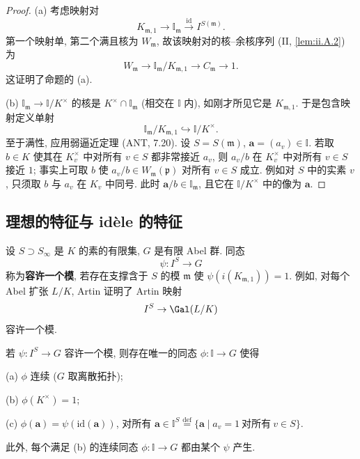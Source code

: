 \begin{proof}
(a) 考虑映射对
\[
K_{\mathfrak{m},1}\to\mathbb{I}_{\mathfrak{m}}\xrightarrow{\ \mathrm{id}\ }I^{S(\mathfrak{m})}.
\]
第一个映射单, 第二个满且核为 $W_{\mathfrak{m}}$, 故该映射对的核--余核序列 (II, \ref{lem:ii.A.2}) 为
\[
W_{\mathfrak{m}}\to\mathbb{I}_{\mathfrak{m}}/K_{\mathfrak{m},1}\to C_{\mathfrak{m}}\to 1.
\]
这证明了命题的 (a).

(b) $\mathbb{I}_{\mathfrak{m}}\to\mathbb{I}/K^{\times}$ 的核是 $K^{\times}\cap\mathbb{I}_{\mathfrak{m}}$ (相交在 $\mathbb{I}$ 内), 如刚才所见它是 $K_{\mathfrak{m},1}$. 于是包含映射定义单射
\[
\mathbb{I}_{\mathfrak{m}}/K_{\mathfrak{m},1}\hookrightarrow\mathbb{I}/K^{\times}.
\]
至于满性, 应用弱逼近定理 (ANT, 7.20). 设 $S=S(\mathfrak{m})$, $\mathbf{a}=(a_v)\in\mathbb{I}$. 若取 $b\in K$ 使其在 $K_v^{\times}$ 中对所有 $v\in S$ 都非常接近 $a_v$, 则 $a_v/b$ 在 $K_v^{\times}$ 中对所有 $v\in S$ 接近 $1$; 事实上可取 $b$ 使 $a_v/b\in W_{\mathfrak{m}}(\mathfrak{p})$ 对所有 $v\in S$ 成立. 例如对 $S$ 中的实素 $v$, 只须取 $b$ 与 $a_v$ 在 $K_v$ 中同号. 此时 $\mathbf{a}/b\in\mathbb{I}_{\mathfrak{m}}$, 且它在 $\mathbb{I}/K^{\times}$ 中的像为 $\mathbf{a}$.
\end{proof}

\subsection*{理想的特征与 idèle 的特征}

设 $S\supset S_\infty$ 是 $K$ 的素的有限集, $G$ 是有限 Abel 群. 同态
\[
\psi\colon I^S\to G
\]
称为\textbf{容许一个模}, 若存在支撑含于 $S$ 的模 $\mathfrak{m}$ 使 $\psi(i(K_{\mathfrak{m},1}))=1$. 例如, 对每个 Abel 扩张 $L/K$, Artin 证明了 Artin 映射
\[
I^S\to\Gal(L/K)
\]
容许一个模.

\begin{proposition}\label{prop:v.4.7}
若 $\psi\colon I^S\to G$ 容许一个模, 则存在唯一的同态 $\phi\colon\mathbb{I}\to G$ 使得

(a) $\phi$ 连续 ($G$ 取离散拓扑);

(b) $\phi(K^{\times})=1$;

(c) $\phi(\mathbf{a})=\psi(\mathrm{id}(\mathbf{a}))$, 对所有 $\mathbf{a}\in\mathbb{I}^S\overset{\mathrm{def}}{=}\{\mathbf{a}\mid a_v=1\ \text{对所有}\ v\in S\}$.

此外, 每个满足 (b) 的连续同态 $\phi\colon\mathbb{I}\to G$ 都由某个 $\psi$ 产生.
\end{proposition}

